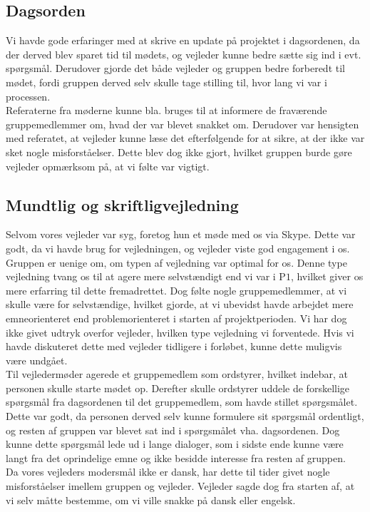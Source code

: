 	\subsection{Dagsorden}
	Vi havde gode erfaringer med at skrive en update på projektet i dagsordenen, da der derved blev sparet tid til mødets, og vejleder kunne bedre sætte sig ind i evt. spørgsmål. Derudover gjorde det både vejleder og gruppen bedre forberedt til mødet, fordi gruppen derved selv skulle tage stilling til, hvor lang vi var i processen. \\
	Referaterne fra møderne kunne bla. bruges til at informere de fraværende gruppemedlemmer om, hvad der var blevet snakket om. Derudover var hensigten med referatet, at vejleder kunne læse det efterfølgende for at sikre, at der ikke var sket nogle misforståelser. Dette blev dog ikke gjort, hvilket gruppen burde gøre vejleder opmærksom på, at vi følte var vigtigt. 
	
	\subsection{Mundtlig og skriftligvejledning}
	Selvom vores vejleder var syg, foretog hun et møde med os via Skype. Dette var godt, da vi havde brug for vejledningen, og vejleder viste god engagement i os. \\
	Gruppen er uenige om, om typen af vejledning var optimal for os. Denne type vejledning tvang os til at agere mere selvstændigt end vi var i P$1$, hvilket giver os mere erfarring til dette fremadrettet. Dog følte nogle gruppemedlemmer, at vi skulle være for selvstændige, hvilket gjorde, at vi ubevidst havde arbejdet mere emneorienteret end problemorienteret i starten af projektperioden. Vi har dog ikke givet udtryk overfor vejleder, hvilken type vejledning vi forventede. Hvis vi havde diskuteret dette med vejleder tidligere i forløbet, kunne dette muligvis være undgået. \\
	Til vejledermøder agerede et gruppemedlem som ordstyrer, hvilket indebar, at personen skulle starte mødet op. Derefter skulle ordstyrer uddele de forskellige spørgsmål fra dagsordenen til det gruppemedlem, som havde stillet spørgsmålet. Dette var godt, da personen derved selv kunne formulere sit spørgsmål ordentligt, og resten af gruppen var blevet sat ind i spørgsmålet vha. dagsordenen. Dog kunne dette spørgsmål lede ud i lange dialoger, som i sidste ende kunne være langt fra det oprindelige emne og ikke besidde interesse fra resten af gruppen. \\
	Da vores vejleders modersmål ikke er dansk, har dette til tider givet nogle misforståelser imellem gruppen og vejleder. Vejleder sagde dog fra starten af, at vi selv måtte bestemme, om vi ville snakke på dansk eller engelsk.
	

